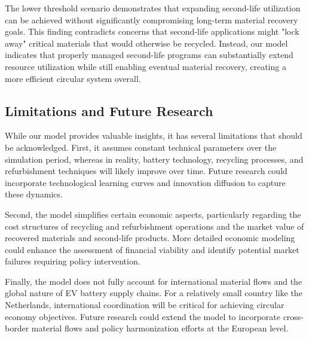 The lower threshold scenario demonstrates that expanding second-life utilization can be achieved without significantly compromising long-term material recovery goals. This finding contradicts concerns that second-life applications might "lock away" critical materials that would otherwise be recycled. Instead, our model indicates that properly managed second-life programs can substantially extend resource utilization while still enabling eventual material recovery, creating a more efficient circular system overall.

\subsection{Limitations and Future Research}
While our model provides valuable insights, it has several limitations that should be acknowledged. First, it assumes constant technical parameters over the simulation period, whereas in reality, battery technology, recycling processes, and refurbishment techniques will likely improve over time. Future research could incorporate technological learning curves and innovation diffusion to capture these dynamics.

Second, the model simplifies certain economic aspects, particularly regarding the cost structures of recycling and refurbishment operations and the market value of recovered materials and second-life products. More detailed economic modeling could enhance the assessment of financial viability and identify potential market failures requiring policy intervention.

Finally, the model does not fully account for international material flows and the global nature of EV battery supply chains. For a relatively small country like the Netherlands, international coordination will be critical for achieving circular economy objectives. Future research could extend the model to incorporate cross-border material flows and policy harmonization efforts at the European level.